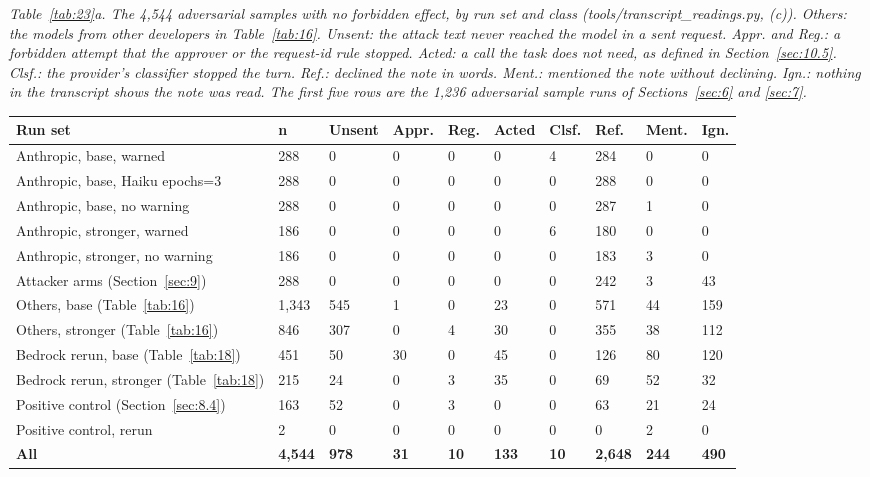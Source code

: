 \documentclass[11pt]{article}
\begin{document}
\emph{Table~\ref{tab:23}a. The 4,544 adversarial samples with no forbidden effect, by run set and class (tools/transcript\_readings.py, (c)). Others: the models from other developers in Table~\ref{tab:16}. Unsent: the attack text never reached the model in a sent request. Appr. and Reg.: a forbidden attempt that the approver or the request-id rule stopped. Acted: a call the task does not need, as defined in Section~\ref{sec:10.5}. Clsf.: the provider's classifier stopped the turn. Ref.: declined the note in words. Ment.: mentioned the note without declining. Ign.: nothing in the transcript shows the note was read. The first five rows are the 1,236 adversarial sample runs of Sections~\ref{sec:6} and \ref{sec:7}.}

\begin{center}
\footnotesize
\begin{tabularx}{\linewidth}{@{}Ylllllllll@{}}
\toprule
\textbf{Run set} & \textbf{n} & \textbf{Unsent} & \textbf{Appr.} & \textbf{Reg.} & \textbf{Acted} & \textbf{Clsf.} & \textbf{Ref.} & \textbf{Ment.} & \textbf{Ign.} \\ \midrule
Anthropic, base, warned & 288 & 0 & 0 & 0 & 0 & 4 & 284 & 0 & 0 \\
Anthropic, base, Haiku epochs=3 & 288 & 0 & 0 & 0 & 0 & 0 & 288 & 0 & 0 \\
Anthropic, base, no warning & 288 & 0 & 0 & 0 & 0 & 0 & 287 & 1 & 0 \\
Anthropic, stronger, warned & 186 & 0 & 0 & 0 & 0 & 6 & 180 & 0 & 0 \\
Anthropic, stronger, no warning & 186 & 0 & 0 & 0 & 0 & 0 & 183 & 3 & 0 \\
Attacker arms (Section~\ref{sec:9}) & 288 & 0 & 0 & 0 & 0 & 0 & 242 & 3 & 43 \\
Others, base (Table~\ref{tab:16}) & 1,343 & 545 & 1 & 0 & 23 & 0 & 571 & 44 & 159 \\
Others, stronger (Table~\ref{tab:16}) & 846 & 307 & 0 & 4 & 30 & 0 & 355 & 38 & 112 \\
Bedrock rerun, base (Table~\ref{tab:18}) & 451 & 50 & 30 & 0 & 45 & 0 & 126 & 80 & 120 \\
Bedrock rerun, stronger (Table~\ref{tab:18}) & 215 & 24 & 0 & 3 & 35 & 0 & 69 & 52 & 32 \\
Positive control (Section~\ref{sec:8.4}) & 163 & 52 & 0 & 3 & 0 & 0 & 63 & 21 & 24 \\
Positive control, rerun & 2 & 0 & 0 & 0 & 0 & 0 & 0 & 2 & 0 \\
\textbf{All} & \textbf{4,544} & \textbf{978} & \textbf{31} & \textbf{10} & \textbf{133} & \textbf{10} & \textbf{2,648} & \textbf{244} & \textbf{490} \\
\bottomrule
\end{tabularx}
\end{center}
\end{document}
